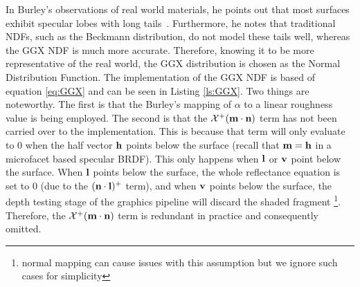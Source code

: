 
In Burley's observations of real world materials, he points out that most surfaces exhibit specular lobes with long tails~\cite{Burley2012Physically}. Furthermore, he notes that traditional NDFs, such as the Beckmann distribution, do not model these tails well, whereas the GGX NDF is much more accurate. Therefore, knowing it to be more representative of the real world, the GGX distribution is chosen as the Normal Distribution Function. The implementation of the GGX NDF is based of equation \ref{eq:GGX} and can be seen in Listing \ref{ls:GGX}. Two things are noteworthy. The first is that the Burley's mapping of \begin{math}\alpha\end{math} to a linear roughness value is being employed. The second is that the \begin{math}\mathcal{X}^+(\mathbf{m}\cdot\mathbf{n})\end{math} term has not been carried over to the implementation. This is because that term will only evaluate to 0 when the half vector \begin{math}\mathbf{h}\end{math} points below the surface (recall that \begin{math}\mathbf{m} = \mathbf{h}\end{math} in a microfacet based specular BRDF). This only happens when \begin{math}\mathbf{l}\end{math} or \begin{math}\mathbf{v}\end{math} point below the surface. When \begin{math}\mathbf{l}\end{math} points below the surface, the whole reflectance equation is set to 0 (due to the \begin{math}(\mathbf{n}\cdot\mathbf{l})^+\end{math} term), and when \begin{math}\mathbf{v}\end{math} points below the surface, the depth testing stage of the graphics pipeline will discard the shaded fragment \footnote{normal mapping can cause issues with this assumption but we ignore such cases for simplicity}. Therefore, the \begin{math}\mathcal{X}^+(\mathbf{m}\cdot\mathbf{n})\end{math} term is redundant in practice and consequently omitted.

